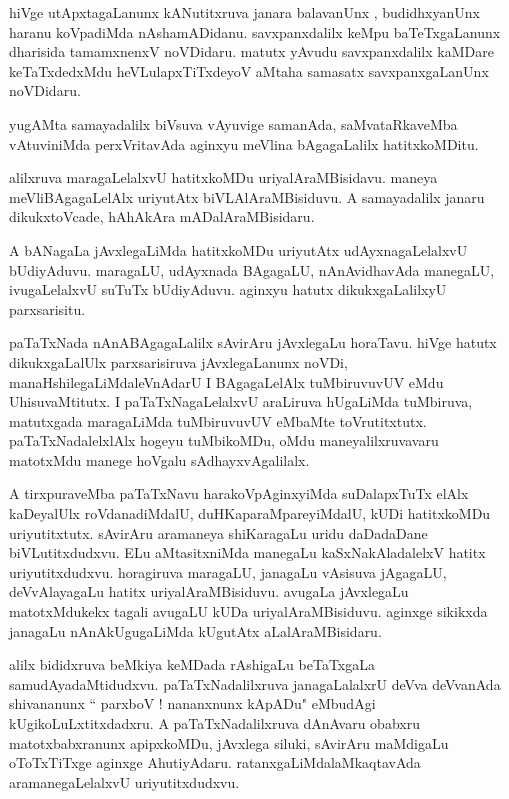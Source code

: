 \documentclass{article}
\begin{document}
\begin{mn}
hiVge utApxtagaLanunx kANutitxruva janara balavanUnx , budidhxyanUnx haranu koVpadiMda 
nAshamADidanu. savxpanxdalilx keMpu baTeTxgaLanunx dharisida tamamxnenxV noVDidaru.
matutx yAvudu savxpanxdalilx kaMDare keTaTxdedxMdu heVLulapxTiTxdeyoV aMtaha samasatx 
savxpanxgaLanUnx noVDidaru.
\end{mn}

\begin{mn}
yugAMta samayadalilx biVsuva vAyuvige samanAda, saMvataRkaveMba vAtuviniMda perxVritavAda aginxyu 
meVlina bAgagaLalilx hatitxkoMDitu.
\end{mn}

\begin{mn}
alilxruva maragaLelalxvU hatitxkoMDu uriyalAraMBisidavu. maneya meVliBAgagaLelAlx uriyutAtx 
biVLAlAraMBisiduvu. A samayadalilx janaru dikukxtoVcade, hAhAkAra mADalAraMBisidaru.
\end{mn}

\begin{mn}
A bANagaLa jAvxlegaLiMda hatitxkoMDu uriyutAtx udAyxnagaLelalxvU bUdiyAduvu. maragaLU,
udAyxnada BAgagaLU, nAnAvidhavAda manegaLU, ivugaLelalxvU suTuTx bUdiyAduvu. aginxyu hatutx
dikukxgaLalilxyU parxsarisitu.
\end{mn}

\begin{mn}
paTaTxNada nAnABAgagaLalilx sAvirAru jAvxlegaLu horaTavu. hiVge hatutx dikukxgaLalUlx 
parxsarisiruva jAvxlegaLanunx noVDi, manaHshilegaLiMdaleVnAdarU I BAgagaLelAlx tuMbiruvuvUV eMdu 
UhisuvaMtitutx. I  paTaTxNagaLelalxvU araLiruva hUgaLiMda tuMbiruva, matutxgada maragaLiMda 
tuMbiruvuvUV eMbaMte toVrutitxtutx. paTaTxNadalelxlAlx hogeyu tuMbikoMDu, oMdu maneyalilxruvavaru
matotxMdu manege hoVgalu sAdhayxvAgalilalx.
\end{mn}

\begin{mn}
A tirxpuraveMba paTaTxNavu harakoVpAginxyiMda suDalapxTuTx elAlx kaDeyalUlx roVdanadiMdalU,
duHKaparaMpareyiMdalU, kUDi hatitxkoMDu uriyutitxtutx. sAvirAru aramaneya shiKaragaLu uridu 
daDadaDane biVLutitxdudxvu. ELu aMtasitxniMda manegaLu kaSxNakAladalelxV hatitx uriyutitxdudxvu.
horagiruva maragaLU, janagaLu vAsisuva jAgagaLU, deVvAlayagaLu hatitx uriyalAraMBisiduvu. avugaLa
jAvxlegaLu matotxMdukekx tagali avugaLU kUDa uriyalAraMBisiduvu. aginxge sikikxda janagaLu 
nAnAkUgugaLiMda kUgutAtx aLalAraMBisidaru.
\end{mn} 

\begin{mn}
alilx bididxruva beMkiya keMDada rAshigaLu beTaTxgaLa samudAyadaMtidudxvu. paTaTxNadalilxruva 
janagaLalalxrU deVva deVvanAda shivananunx `` parxboV ! nananxnunx kApADu" eMbudAgi 
kUgikoLuLxtitxdadxru. A paTaTxNadalilxruva dAnAvaru obabxru matotxbabxranunx apipxkoMDu,
jAvxlega siluki, sAvirAru maMdigaLu oToTxTiTxge aginxge AhutiyAdaru. ratanxgaLiMdalaMkaqtavAda
aramanegaLelalxvU uriyutitxdudxvu.
\end{mn}
\end{document}
